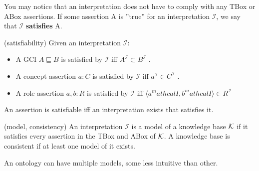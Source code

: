 You may notice that an interpretation does not have to comply with any TBox or ABox assertions.  If some assertion A is ''true'' for an interpretation $\mathcal{I}$, we say that $\mathcal{I}$ \textbf{satisfies} A.

\begin{mydef} (satisfiability)
Given an interpretation $\mathcal{I}$:
\begin{itemize}
\item  A GCI $A \sqsubseteq B$ is satisfied by $\mathcal{I}$ iff $A^\mathcal{I} \subset   B^\mathcal{I} $ .
\item  A concept assertion $a:C$ is satisfied by $\mathcal{I}$ iff $a^\mathcal{I} \in C^\mathcal{I} $ .
\item A role assertion $a,b:R$ is satisfied by $\mathcal{I}$ iff $ \langle a^mathcal{I} , b^mathcal{I} \rangle \in R^\mathcal{I} $
\end{itemize}
An assertion is satisfiable iff an interpretation exists that satisfies it.
\end{mydef}

\begin{mydef} (model, consistency)
An interpretation $\mathcal{I}$ is a model of a knowledge base $\mathcal{K}$ if it satisfies every assertion in the TBox and ABox of $\mathcal{K}$.  A knowledge base is consistent if at least one model of it exists.
\end{mydef}


An ontology can have multiple models, some less intuitive than other.

